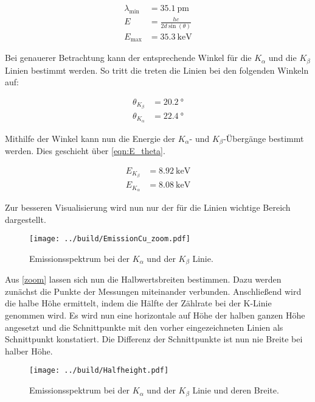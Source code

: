 \begin{align}
    \lambda_\text{min} &=\qty{35.1}{\pico \meter}\\
    \label{eqn:E_theta}
    E &= \frac{hc}{2 d \sin(\theta)}\\
    E_\text{max} &= \qty{35.3}{\kilo \electronvolt}
\end{align}

\noindent Bei genauerer Betrachtung kann der entsprechende Winkel für die $K_\alpha$ und die $K_\beta$ Linien bestimmt werden. So tritt die treten die 
Linien bei den folgenden Winkeln auf:

\begin{align}
    \theta_{K_\beta} &= \qty{20.2}{\degree}\\ 
    \theta_{K_\alpha}  &= \qty{22.4}{\degree} 
\end{align}
    
\noindent Mithilfe der Winkel kann nun die Energie der $K_\alpha$- und  $K_\beta$-Übergänge bestimmt werden. Dies geschieht über \autoref{eqn:E_theta}.

\begin{align}
    E_{K_\beta} &= \qty{8.92}{\kilo \electronvolt}\\ 
    E_{K_\alpha}  &= \qty{8.08}{\kilo \electronvolt} 
\end{align}

\noindent Zur besseren Visualisierung wird nun nur der für die Linien wichtige Bereich dargestellt. 

\begin{figure}[H]
    \centering
    \texttt{[image: ../build/EmissionCu\_zoom.pdf]}
    \caption{Emissionsspektrum bei der $K_\alpha$ und der $K_\beta$ Linie.}
    \label{zoom}
\end{figure}    

\noindent Aus \autoref{zoom} lassen sich nun die Halbwertsbreiten bestimmen. Dazu werden zunächst die Punkte der Messungen miteinander verbunden. 
Anschließend wird die halbe Höhe ermittelt, indem die Hälfte der Zählrate bei der K-Linie genommen wird. Es wird nun eine horizontale auf Höhe der 
halben ganzen Höhe angesetzt und die Schnittpunkte mit den vorher eingezeichneten Linien als Schnittpunkt konstatiert. Die Differenz der Schnittpunkte 
ist nun nie Breite bei halber Höhe.

\begin{figure}[H]
    \centering
    \texttt{[image: ../build/Halfheight.pdf]}
    \caption{Emissionsspektrum bei der $K_\alpha$ und der $K_\beta$ Linie und deren Breite.}
\end{figure}    


